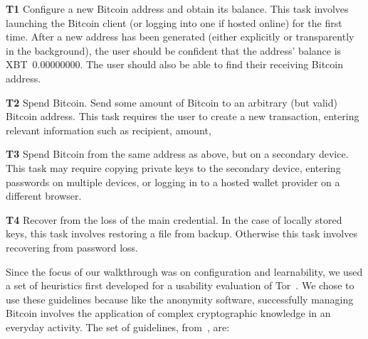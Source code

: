 \begin{compactlist}
	\item[\bf T1] Configure a new Bitcoin address and obtain its balance. This task involves launching the Bitcoin client (or logging into one if hosted online) for the first time. After a new address has been generated (either explicitly or transparently in the background), the user should be confident that the address' balance is XBT~0.00000000. The user should also be able to find their receiving Bitcoin address.\label{sec:ct-1}
	\item[\bf T2] Spend Bitcoin. Send some amount of Bitcoin to an arbitrary (but valid) Bitcoin address. This task requires the user to create a new transaction, entering relevant information such as recipient, amount, \etc\label{sec:ct-2}
	\item[\bf T3] Spend Bitcoin from the same address as above, but on a secondary device. This task may require copying private keys to the secondary device, entering passwords on multiple devices, or logging in to a hosted wallet provider on a different browser.\label{sec:ct-3}
	\item[\bf T4] Recover from the loss of the main credential. In the case of locally stored keys, this task involves restoring a file from backup. Otherwise this task involves recovering from password loss.\label{sec:ct-4}
\end{compactlist}

Since the focus of our walkthrough was on configuration and learnability, we used a set of heuristics first developed for a usability evaluation of Tor~\cite{COA07}. We chose to use these guidelines because like the anonymity software, successfully managing Bitcoin involves the application of complex cryptographic knowledge in an everyday activity. The set of guidelines, from~\cite{COA07}, are: 



